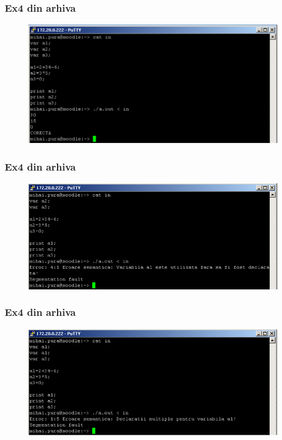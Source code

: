 \documentclass[pdf]{beamer}
\begin{document}
\begin{frame}
\frametitle{Ex4 din arhiva}
\begin{figure}
	\includegraphics[width=\linewidth]{poza1.png}
\end{figure}
\end{frame}



\begin{frame}
\frametitle{Ex4 din arhiva}
\begin{figure}
\includegraphics[width=\linewidth]{picture1.png} 
\end{figure}
\end{frame}



\begin{frame}
\frametitle{Ex4 din arhiva}
\begin{figure}
\includegraphics[width=\linewidth]{poza2.png} 
\end{figure}
\end{frame}
\end{document}
